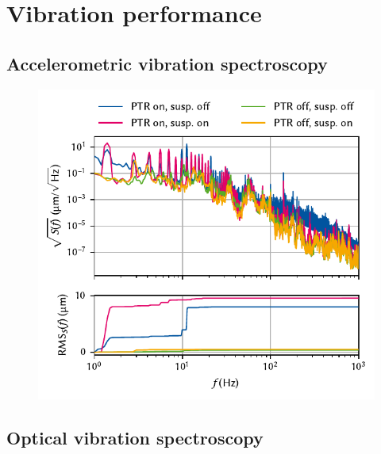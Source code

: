 \chapter{Vibration performance}\label{ch:setup:vibrations}

\section{Accelerometric vibration spectroscopy}\label{sec:setup:vibrations:accel}

\begin{figure}
    \centering
    \includegraphics{img/pdf/setup/spect_accel}
    \caption[]{}
    \label{fig:}
\end{figure}

\section{Optical vibration spectroscopy}\label{sec:setup:vibrations:optic}

